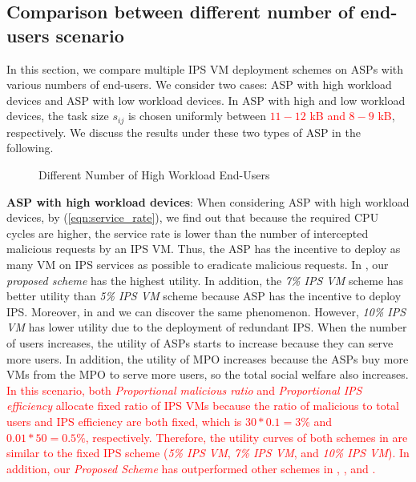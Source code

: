\documentclass[10pt,journal, compsoc]{IEEEtran}
\begin{document}
\subsection{Comparison between different number of end-users scenario}
In this section, we compare multiple IPS VM deployment schemes on ASPs with various numbers of end-users. We consider two cases: ASP with high workload devices and ASP with low workload devices. In ASP with high and low workload devices, the task size $s_{ij}$ is chosen uniformly between \textcolor{red}{$11 - 12$ kB and $8 - 9$ kB}, respectively. We discuss the results under these two types of ASP in the following. 
\begin{figure}[!]
\captionsetup{justification=centering}
  \hfill
  \hfill
\label{fig:num_cmp_high}
\caption{Different Number of High Workload End-Users}
\end{figure}

\textbf{ASP with high workload devices}: 
When considering ASP with high workload devices, by (\ref{eqn:service_rate}), we find out that because the required CPU cycles are higher, the service rate is lower than the number of intercepted malicious requests by an IPS VM. Thus, the ASP has the incentive to deploy as many VM on IPS services as possible to eradicate malicious requests. In , our \textit{proposed scheme} has the highest utility. In addition, the \textit{7\% IPS VM} scheme has better utility than \textit{5\% IPS VM} scheme because ASP has the incentive to deploy IPS. Moreover, in  and  we can discover the same phenomenon. However, \textit{10\% IPS VM} has lower utility due to the deployment of redundant IPS. When the number of users increases, the utility of ASPs starts to increase because they can serve more users. In addition, the utility of MPO increases because the ASPs buy more VMs from the MPO to serve more users, so the total social welfare also increases. \textcolor{red}{In this scenario, both \textit{Proportional malicious ratio} and \textit{Proportional IPS efficiency} allocate fixed ratio of IPS VMs because the ratio of malicious to total users and IPS efficiency are both fixed, which is $30 * 0.1 = 3\%$ and $0.01 * 50 = 0.5\%$, respectively. Therefore, the utility curves of both schemes in  are similar to the fixed IPS scheme (\textit{5\% IPS VM}, \textit{7\% IPS VM}, and \textit{10\% IPS VM}). In addition, our \textit{Proposed Scheme} has outperformed other schemes in , , and .}
\end{document}
